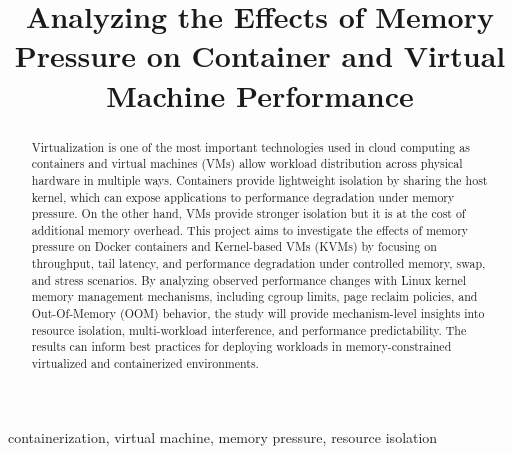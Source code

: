 \documentclass[conference]{IEEEtran}
\begin{document}
\title{Analyzing the Effects of Memory Pressure on Container and Virtual Machine Performance\\
}

\author{
\and
{}
}

\maketitle

\begin{abstract}
Virtualization is one of the most important technologies used in cloud computing as containers and virtual machines (VMs) allow workload distribution across physical hardware in multiple ways. Containers provide lightweight isolation by sharing the host kernel, which can expose applications to performance degradation under memory pressure. On the other hand, VMs provide stronger isolation but it is at the cost of additional memory overhead. This project aims to investigate the effects of memory pressure on Docker containers and Kernel-based VMs (KVMs) by focusing on throughput, tail latency, and performance degradation under controlled memory, swap, and stress scenarios. By analyzing observed performance changes with Linux kernel memory management mechanisms, including cgroup limits, page reclaim policies, and Out-Of-Memory (OOM) behavior, the study will provide mechanism-level insights into resource isolation, multi-workload interference, and performance predictability. The results can inform best practices for deploying workloads in memory-constrained virtualized and containerized environments.
 
\end{abstract}

\begin{IEEEkeywords}
containerization, virtual machine, memory pressure, resource isolation
\end{IEEEkeywords}
\end{document}
